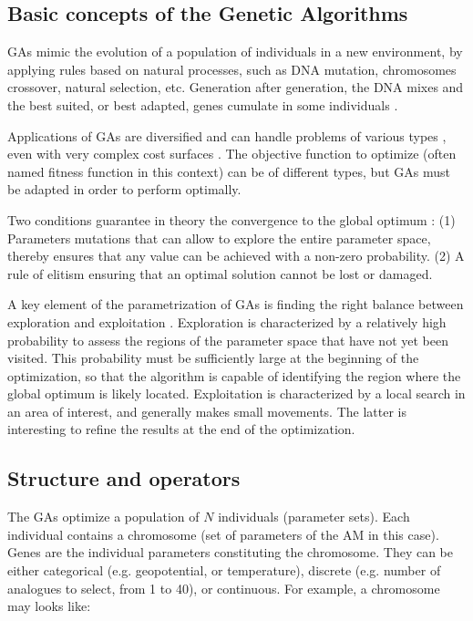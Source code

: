 \documentclass{ametsoc}
\begin{document}
\subsection{Basic concepts of the Genetic Algorithms}

GAs mimic the evolution of a population of individuals in a new environment, by applying rules based on natural processes, such as DNA mutation, chromosomes crossover, natural selection, etc. Generation after generation, the DNA mixes and the best suited, or best adapted, genes cumulate in some individuals \citep{Beasley1996a}.

Applications of GAs are diversified and can handle problems of various types \citep{Joines1996a}, even with very complex cost surfaces \citep{Haupt2004}. The objective function to optimize (often named fitness function in this context) can be of different types, but GAs must be adapted in order to perform optimally.

Two conditions guarantee in theory the convergence to the global optimum \citep{Zitzler2004a}: (1) Parameters mutations that can allow to explore the entire parameter space, thereby ensures that any value can be achieved with a non-zero probability. (2) A rule of elitism ensuring that an optimal solution cannot be lost or damaged.

A key element of the parametrization of GAs is finding the right balance between exploration and exploitation \citep{Back1992a, Smith1997a}. Exploration is characterized by a relatively high probability to assess the regions of the parameter space that have not yet been visited. This probability must be sufficiently large at the beginning of the optimization, so that the algorithm is capable of identifying the region where the global optimum is likely located. Exploitation is characterized by a local search in an area of interest, and generally makes small movements. The latter is interesting to refine the results at the end of the optimization.


\subsection{Structure and operators}

The GAs optimize a population of $N$ individuals (parameter sets). Each individual contains a chromosome (set of parameters of the AM in this case). Genes are the individual parameters constituting the chromosome. They can be either categorical (e.g. geopotential, or temperature), discrete (e.g. number of analogues to select, from 1 to 40), or continuous. For example, a chromosome may looks like:
\end{document}
